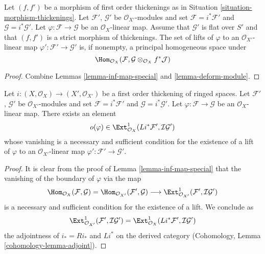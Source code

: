 \begin{lemma}
\label{lemma-inf-map-rel}
Let $(f, f')$ be a morphism of first order thickenings as in
Situation \ref{situation-morphism-thickenings}.
Let $\mathcal{F}'$, $\mathcal{G}'$ be $\mathcal{O}_{X'}$-modules and set
$\mathcal{F} = i^*\mathcal{F}'$ and $\mathcal{G} = i^*\mathcal{G}'$.
Let $\varphi : \mathcal{F} \to \mathcal{G}$ be an $\mathcal{O}_X$-linear map.
Assume that $\mathcal{G}'$ is flat over $S'$ and that
$(f, f')$ is a strict morphism of thickenings.
The set of lifts of $\varphi$ to an $\mathcal{O}_{X'}$-linear map
$\varphi' : \mathcal{F}' \to \mathcal{G}'$ is, if nonempty, a principal
homogeneous space under
$$
\Hom_{\mathcal{O}_X}(\mathcal{F},
\mathcal{G} \otimes_{\mathcal{O}_X} f^*\mathcal{J})
$$
\end{lemma}

\begin{proof}
Combine Lemmas \ref{lemma-inf-map-special} and \ref{lemma-deform-module}.
\end{proof}

\begin{lemma}
\label{lemma-inf-obs-map-special}
Let $i : (X, \mathcal{O}_X) \to (X', \mathcal{O}_{X'})$
be a first order thickening of ringed spaces.
Let $\mathcal{F}'$, $\mathcal{G}'$ be $\mathcal{O}_{X'}$-modules and set
$\mathcal{F} = i^*\mathcal{F}'$ and $\mathcal{G} = i^*\mathcal{G}'$.
Let $\varphi : \mathcal{F} \to \mathcal{G}$ be an $\mathcal{O}_X$-linear map.
There exists an element
$$
o(\varphi) \in
\Ext^1_{\mathcal{O}_X}(Li^*\mathcal{F}',
\mathcal{I}\mathcal{G}')
$$
whose vanishing is a necessary and sufficient condition for the
existence of a lift of $\varphi$ to an $\mathcal{O}_{X'}$-linear map
$\varphi' : \mathcal{F}' \to \mathcal{G}'$.
\end{lemma}

\begin{proof}
It is clear from the proof of Lemma \ref{lemma-inf-map-special} that the
vanishing of the boundary of $\varphi$ via the map
$$
\Hom_{\mathcal{O}_X}(\mathcal{F}, \mathcal{G}) =
\Hom_{\mathcal{O}_{X'}}(\mathcal{F}', \mathcal{G}) \longrightarrow
\Ext^1_{\mathcal{O}_{X'}}(\mathcal{F}', \mathcal{I}\mathcal{G}')
$$
is a necessary and sufficient condition for the existence of a lift. We
conclude as
$$
\Ext^1_{\mathcal{O}_{X'}}(\mathcal{F}', \mathcal{I}\mathcal{G}') =
\Ext^1_{\mathcal{O}_X}(Li^*\mathcal{F}', \mathcal{I}\mathcal{G}')
$$
the adjointness of $i_* = Ri_*$ and $Li^*$ on the derived category
(Cohomology, Lemma \ref{cohomology-lemma-adjoint}).
\end{proof}

